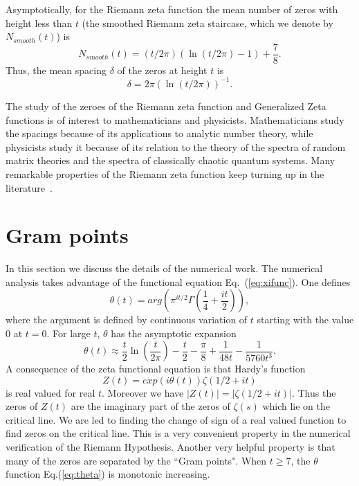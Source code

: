 \documentclass[twoside]{article}
\theoremstyle{definition}
\begin{document}
Asymptotically, for the Riemann zeta function the mean number of 
zeros with height less than $t$ (the smoothed Riemann zeta staircase, which we denote by 
$N_{smooth}(t)$)
is~\cite{Edwards(1974)}
{
\begin{equation}  
N_{smooth}(t) = (t/2\pi)(\ln(t/2\pi)-1)+\frac{7}{8}.
\label{eq:Rnumber}
\end{equation}
}
Thus, the mean spacing $\delta$ of the zeros at height $t$ is 
\begin{equation}  
\delta = 2\pi(\ln (t/2\pi))^{-1}. 
\label{eq:spacing}
\end{equation}

The study of the zeroes of the Riemann zeta function and Generalized 
Zeta functions is of interest to mathematicians and physicists. Mathematicians 
study the spacings because of its applications to analytic number theory, 
while physicists study it because of its  relation 
to the theory of the spectra of random matrix theories 
and the spectra of classically chaotic quantum systems. 
Many remarkable properties of the Riemann zeta function keep turning up in the literature~\cite{os6,Matiyasevich}.

\section{\label{sec3}Gram points}

In this section we discuss the details of the numerical work. 
The numerical analysis takes advantage of the functional 
equation Eq.~(\ref{eq:xifunc}).
One defines
\begin{equation}
\theta(t) = arg (\pi^{it/2} \Gamma(\frac{1}{4} + \frac{it}{2})), 
\label{eq:theta}
\end{equation}
where the argument is defined by continuous variation of $t$ starting with the value $0$ at $t = 0$.
For large $t$, $\theta$ has the asymptotic expansion
\begin{equation}
\theta(t) \approx \frac{t}{2}\ln (\frac{t}{2\pi}) - \frac{t}{2} - \frac{\pi}{8} + \frac{1}{48t} - \frac{1}{5760t^3}. 
\label{eq:thetaAsymptotic}
\end{equation}
A consequence of the zeta functional equation is that Hardy's function 
\begin{equation}
Z(t)=exp(i\theta(t))\zeta(1/2 +it) 
\label{eq:hardy}
\end{equation}
is real valued for real $t$. 
Moreover we have $|Z(t)| = |\zeta(1/2+it)|$. Thus the zeros of $Z(t)$ are the imaginary part of the zeros 
of $\zeta(s)$ which lie on the critical line. We are led to finding the change of sign of a real valued function 
to find zeros on the critical line. This is a very convenient property in the numerical verification 
of the Riemann Hypothesis. Another very helpful property is that many of the zeros are separated by the
``Gram points".  When $t \ge 7$, the $\theta$ function Eq.(\ref{eq:theta}) is monotonic increasing. 
\end{document}
